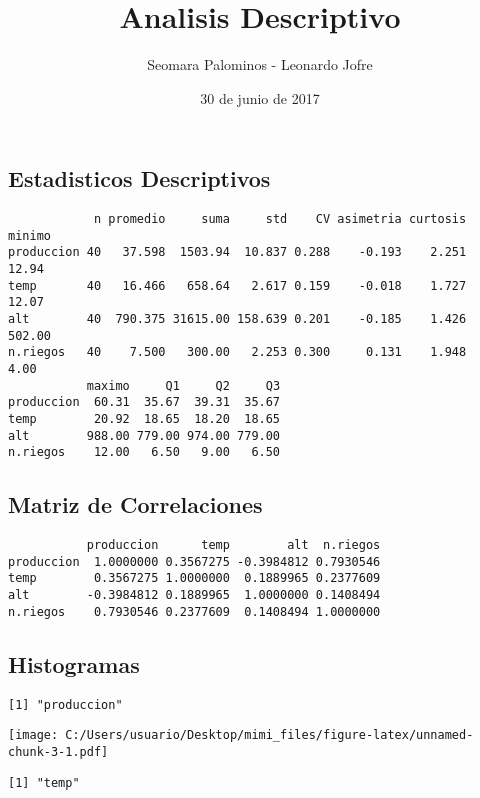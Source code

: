 \documentclass[]{article}
\title{Analisis Descriptivo}
\author{Seomara Palominos - Leonardo Jofre}
\date{30 de junio de 2017}
\begin{document}
\maketitle

\subsection{Estadisticos Descriptivos}\label{estadisticos-descriptivos}

\begin{verbatim}
            n promedio     suma     std    CV asimetria curtosis minimo
produccion 40   37.598  1503.94  10.837 0.288    -0.193    2.251  12.94
temp       40   16.466   658.64   2.617 0.159    -0.018    1.727  12.07
alt        40  790.375 31615.00 158.639 0.201    -0.185    1.426 502.00
n.riegos   40    7.500   300.00   2.253 0.300     0.131    1.948   4.00
           maximo     Q1     Q2     Q3
produccion  60.31  35.67  39.31  35.67
temp        20.92  18.65  18.20  18.65
alt        988.00 779.00 974.00 779.00
n.riegos    12.00   6.50   9.00   6.50
\end{verbatim}

\subsection{Matriz de Correlaciones}\label{matriz-de-correlaciones}

\begin{verbatim}
           produccion      temp        alt  n.riegos
produccion  1.0000000 0.3567275 -0.3984812 0.7930546
temp        0.3567275 1.0000000  0.1889965 0.2377609
alt        -0.3984812 0.1889965  1.0000000 0.1408494
n.riegos    0.7930546 0.2377609  0.1408494 1.0000000
\end{verbatim}

\pagebreak

\subsection{Histogramas}\label{histogramas}

\begin{verbatim}
[1] "produccion"
\end{verbatim}

\texttt{[image: C:/Users/usuario/Desktop/mimi\_files/figure-latex/unnamed-chunk-3-1.pdf]}

\begin{verbatim}
[1] "temp"
\end{verbatim}
\end{document}
